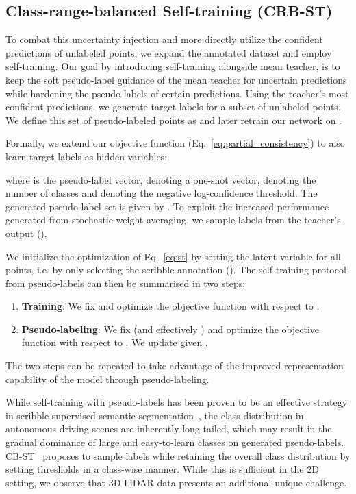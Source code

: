 \documentclass[10pt,twocolumn,letterpaper]{article}
\begin{document}
\subsection{Class-range-balanced Self-training (CRB-ST)} \label{sec:crb}

To combat this uncertainty injection and more directly utilize the confident predictions of unlabeled points, we expand the annotated dataset and employ self-training. 
Our goal by introducing self-training alongside mean teacher, is to keep the soft pseudo-label guidance of the mean teacher for uncertain predictions while hardening the pseudo-labels of certain predictions. Using the teacher's most confident predictions, we generate target labels for a subset of unlabeled points. We define this set of pseudo-labeled points as  and later retrain our network on .


Formally, we extend our objective function (Eq.~\ref{eq:partial_consistency}) to also learn target labels as hidden variables:

where  is the pseudo-label vector,  denoting a one-shot vector,  denoting the number of classes and  denoting the negative log-confidence threshold. The generated pseudo-label set is given by .
To exploit the increased performance generated from stochastic weight averaging, we sample labels from the teacher's output ().


We initialize the optimization of Eq.~\ref{eq:st} by setting the latent variable  for all points, i.e. by only selecting the scribble-annotation (). The self-training protocol from pseudo-labels can then be summarised in two steps:
\begin{enumerate}
    \item \textbf{Training}: We fix  and optimize the objective function with respect to .
    \item \textbf{Pseudo-labeling}:  We fix  (and effectively ) and optimize the objective function with respect to . We update  given .
\end{enumerate}
The two steps can be repeated to take advantage of the improved representation capability of the model through pseudo-labeling.

While self-training with pseudo-labels has been proven to be an effective strategy in scribble-supervised semantic segmentation~\cite{cvpr2016scribblesup, tvcg2020scribble3d}, the class distribution in autonomous driving scenes are inherently long tailed, which may result in the gradual dominance of large and easy-to-learn classes on generated pseudo-labels. CB-ST~\cite{eccv2018classbalanced} proposes to sample labels while retaining the overall class distribution by setting thresholds in a class-wise manner. While this is sufficient in the 2D setting, we observe that 3D LiDAR data presents an additional unique challenge.
\end{document}
